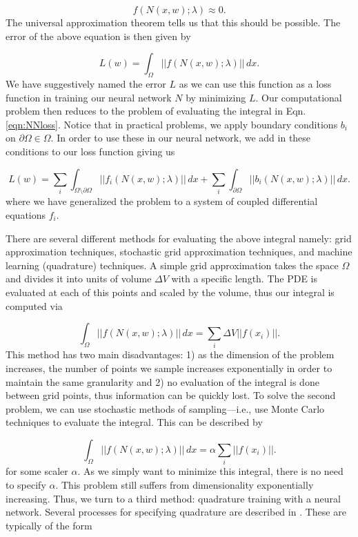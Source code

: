 \documentclass{CUP-JNL-DTM}%
\theoremstyle{definition}
\numberwithin{equation}{section}
\begin{document}
\begin{equation}
	f(N(x, w); \lambda) \approx 0.
	\label{eqn:NNapprox}
\end{equation}
The universal approximation theorem tells us that this should be possible. The error of the above equation is then given by 

\begin{equation}
	L(w) = \int_{\Omega} ||f(N(x,w); \lambda)||\,dx. 
	\label{eqn:NNloss}
\end{equation}
We have suggestively named the error $L$ as we can use this function as a loss function in training our neural network $N$ by minimizing $L$. Our computational problem then reduces to the problem of evaluating the integral in Eqn. \ref{eqn:NNloss}. Notice that in practical problems, we apply boundary conditions $b_i$ on $\partial \Omega \in \Omega$. In order to use these in our neural network, we add in these conditions to our loss function giving us 

\begin{equation}
	L(w) = \sum_i\int_{\Omega\setminus\partial\Omega} ||f_i(N(x,w); \lambda)||\,dx + \sum_i\int_{\partial\Omega} ||b_i(N(x,w); \lambda)||\,dx.
	\label{eqn:complete_loss} 
\end{equation}
where we have generalized the problem to a system of coupled differential equations $f_i$. 

There are several different methods for evaluating the above integral namely: grid approximation techniques, stochastic grid approximation techniques, and machine learning (quadrature) techniques. A simple grid approximation takes the space $\Omega$ and divides it into units of volume $\Delta V$ with a specific length. The PDE is evaluated at each of this points and scaled by the volume, thus our integral is computed via 

\begin{equation}
	\int_{\Omega} ||f(N(x,w); \lambda)||\,dx = \sum_i \Delta V ||f(x_i)||.
\end{equation}
This method has two main disadvantages: 1) as the dimension of the problem increases, the number of points we sample increases exponentially in order to maintain the same granularity and 2) no evaluation of the integral is done between grid points, thus information can be quickly lost. To solve the second problem, we can use stochastic methods of sampling---i.e., use Monte Carlo techniques to evaluate the integral. This can be described by 

\begin{equation}
	\int_{\Omega} ||f(N(x,w); \lambda)||\,dx = \alpha \sum_i ||f(x_i)||.
\end{equation}
for some scaler $\alpha$. As we simply want to minimize this integral, there is no need to specify $\alpha$. This problem still suffers from dimensionality exponentially increasing. Thus, we turn to a third method: quadrature training with a neural network. Several processes for specifying quadrature are described in \cite{riveraQuadratureRulesSolving2022}. These are typically of the form 
\end{document}
